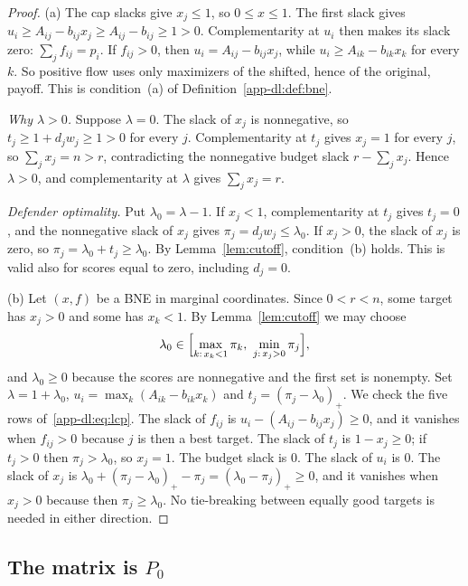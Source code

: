 \begin{proof}
(a) The cap slacks give $x_j\le1$, so $0\le x\le1$. The first slack gives
$u_i\ge A_{ij}-b_{ij}x_j\ge A_{ij}-b_{ij}\ge1>0$. Complementarity at $u_i$ then makes its slack zero:
$\sum_jf_{ij}=p_i$. If $f_{ij}>0$, then $u_i=A_{ij}-b_{ij}x_j$, while $u_i\ge A_{ik}-b_{ik}x_k$ for every
$k$. So positive flow uses only maximizers of the shifted, hence of the original, payoff. This is
condition~(a) of Definition~\ref{app-dl:def:bne}.

\emph{Why $\lambda>0$.} Suppose $\lambda=0$. The slack of $x_j$ is nonnegative, so
$t_j\ge1+d_jw_j\ge1>0$ for every $j$. Complementarity at $t_j$ gives $x_j=1$ for every $j$, so
$\sum_jx_j=n>r$, contradicting the nonnegative budget slack $r-\sum_jx_j$. Hence $\lambda>0$, and
complementarity at $\lambda$ gives $\sum_jx_j=r$.

\emph{Defender optimality.} Put $\lambda_0=\lambda-1$. If $x_j<1$, complementarity at $t_j$ gives
$t_j=0$, and the nonnegative slack of $x_j$ gives $\pi_j=d_jw_j\le\lambda_0$. If $x_j>0$, the slack of
$x_j$ is zero, so $\pi_j=\lambda_0+t_j\ge\lambda_0$. By Lemma~\ref{lem:cutoff}, condition~(b)
holds. This is valid also for scores equal to zero, including $d_j=0$.

(b) Let $(x,f)$ be a BNE in marginal coordinates. Since $0<r<n$, some target has $x_j>0$ and some has
$x_k<1$. By Lemma~\ref{lem:cutoff} we may choose
\[
  \lambda_0\in\Bigl[\max_{k:\,x_k<1}\pi_k,\ \min_{j:\,x_j>0}\pi_j\Bigr],
\]
and $\lambda_0\ge0$ because the scores are nonnegative and the first set is nonempty. Set
$\lambda=1+\lambda_0$, $u_i=\max_k(A_{ik}-b_{ik}x_k)$ and $t_j=(\pi_j-\lambda_0)_+$. We check the five
rows of~\eqref{app-dl:eq:lcp}. The slack of $f_{ij}$ is $u_i-(A_{ij}-b_{ij}x_j)\ge0$, and it vanishes
when $f_{ij}>0$ because $j$ is then a best target. The slack of $t_j$ is $1-x_j\ge0$; if $t_j>0$ then
$\pi_j>\lambda_0$, so $x_j=1$. The budget slack is $0$. The slack of $u_i$ is $0$. The slack of $x_j$ is
$\lambda_0+(\pi_j-\lambda_0)_+-\pi_j=(\lambda_0-\pi_j)_+\ge0$, and it vanishes when $x_j>0$ because
then $\pi_j\ge\lambda_0$. No tie-breaking between equally good targets is needed in either direction.
\end{proof}

\subsection{The matrix is \texorpdfstring{$P_0$}{P0}}\label{app-dl:sec:p0}

